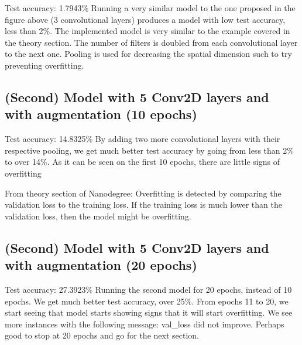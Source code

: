 \documentclass[11pt]{article}
\begin{document}
Test accuracy: 1.7943\% Running a very similar model to the one proposed
in the figure above (3 convolutional layers) produces a model with low
test accuracy, less than 2\%. The implemented model is very similar to
the example covered in the theory section. The number of filters is
doubled from each convolutional layer to the next one. Pooling is used
for decreasing the spatial dimension such to try preventing overfitting.

\hypertarget{second-model-with-5-conv2d-layers-and-with-augmentation-10-epochs}{%
\subsection{(Second) Model with 5 Conv2D layers and with augmentation
(10
epochs)}\label{second-model-with-5-conv2d-layers-and-with-augmentation-10-epochs}}

Test accuracy: 14.8325\% By adding two more convolutional layers with
their respective pooling, we get much better test accuracy by going from
less than 2\% to over 14\%. As it can be seen on the first 10 epochs,
there are little signs of overfitting

From theory section of Nanodegree: Overfitting is detected by comparing
the validation loss to the training loss. If the training loss is much
lower than the validation loss, then the model might be overfitting.

\hypertarget{second-model-with-5-conv2d-layers-and-with-augmentation-20-epochs}{%
\subsection{(Second) Model with 5 Conv2D layers and with augmentation
(20
epochs)}\label{second-model-with-5-conv2d-layers-and-with-augmentation-20-epochs}}

Test accuracy: 27.3923\% Running the second model for 20 epochs, instead
of 10 epochs. We get much better test accuracy, over 25\%. From epochs
11 to 20, we start seeing that model starts showing signs that it will
start overfitting. We see more instances with the following message:
val\_loss did not improve. Perhaps good to stop at 20 epochs and go for
the next section.
\end{document}
